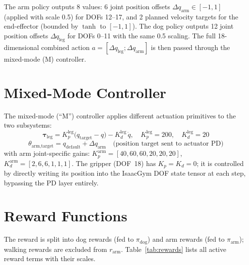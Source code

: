 The arm policy outputs 8 values: 6 joint position offsets $\Delta q_\text{arm}
\in [-1, 1]$ (applied with scale 0.5) for DOFs 12--17, and 2 planned
velocity targets for the end-effector (bounded by $\tanh$ to $[-1, 1]$).
The dog policy outputs 12 joint position offsets $\Delta q_\text{leg}$ for
DOFs 0--11 with the same 0.5 scaling.
The full 18-dimensional combined action $a = [\Delta q_\text{leg};
\Delta q_\text{arm}]$ is then passed through the mixed-mode (M) controller.

\section{Mixed-Mode Controller}
\label{sec:control}

The mixed-mode (``M'') controller applies different actuation primitives to
the two subsystems:
\begin{equation}
  \boldsymbol{\tau}_\text{leg} =
  K_p^\text{leg}\bigl(q_\text{target} - q\bigr)
  - K_d^\text{leg}\,\dot{q},
  \quad
  K_p^\text{leg} = 200,\quad K_d^\text{leg} = 20
  \label{eq:leg_torque}
\end{equation}
\begin{equation}
  \theta_\text{arm,target} = q_\text{default} + \Delta q_\text{arm}
  \quad\text{(position target sent to actuator PD)}
  \label{eq:arm_pos}
\end{equation}
with arm joint-specific gains:
$K_p^\text{arm} = [40, 60, 60, 20, 20, 20]$,
$K_d^\text{arm} = [2, 6, 6, 1, 1, 1]$.
The gripper (DOF~18) has $K_p = K_d = 0$; it is controlled by directly
writing its position into the IsaacGym DOF state tensor at each step,
bypassing the PD layer entirely.

\section{Reward Functions}
\label{sec:rewards}

The reward is split into dog rewards (fed to $\pi_\text{dog}$) and arm
rewards (fed to $\pi_\text{arm}$); walking rewards are excluded from
$r_\text{arm}$.
Table~\ref{tab:rewards} lists all active reward terms with their scales.


